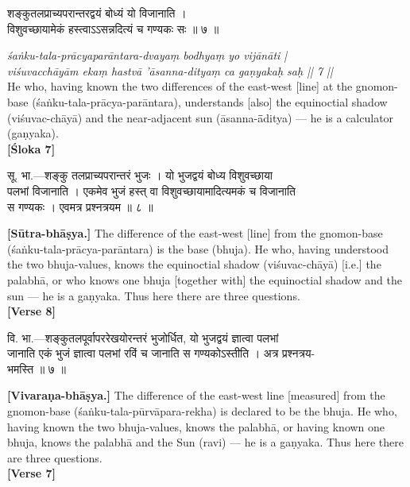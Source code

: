 \documentclass[11pt,a4paper]{article}
\newcommand{\dev}[1]{{\devanagarifont #1}}
\newcommand{\bilingualpair}[2]{%
  \noindent%
  \begin{minipage}[t]{0.48\textwidth}
    #1%
  \end{minipage}%
  \hfill%
  \begin{minipage}[t]{0.48\textwidth}
    #2%
  \end{minipage}%
  \par\vspace{0.5em}%
}
\newenvironment{sanskritcol}{\devanagarifont\small}{}
\newenvironment{englishcol}{\iastfont\small}{}
\begin{document}
\vspace{0.3cm}
\bilingualpair{%
\begin{sanskritcol}
\dev{शङ्कुतलप्राच्यपरान्तरद्वयं बोध्यं यो विजानाति ।}\\[0.3em]
\dev{विशुवच्छायामेकं हस्त्वाऽऽसन्नदित्यं च गण्यकः सः ॥ ७ ॥}
\end{sanskritcol}%
}{%
\begin{englishcol}
\textit{\'saṅku-tala-prācyaparāntara-dvayaṃ bodhyaṃ yo vijānāti |}\\[0.3em]
\textit{vi\'suvacchāyām ekaṃ hastvā '\=asanna-dityaṃ ca gaṇyakaḥ saḥ || 7 ||}\\[0.3em]
He who, having known the two differences of the east-\-west [line] at the gnomon-\-base (\'saṅku-tala-prācya-parāntara), understands [also] the equinoctial shadow (vi\'suvac-chāyā) and the near-\-adjacent sun (\=asanna-\=āditya) --- he is a calculator (gaṇyaka).\\[0.3em]
\hfill \textbf{[Śloka 7]}
\end{englishcol}%
}

\vspace{0.3cm}
\bilingualpair{%
\begin{sanskritcol}
\dev{सू. भा.---शङ्कु तलप्राच्यपरान्तरं भुजः । यो भुजद्वयं बोध्य विशुवच्छाया}\\[0.3em]
\dev{पलभां विजानाति । एकमेव भुजं हस्त् वा विशुवच्छायामादित्यमकं च विजानाति}\\[0.3em]
\dev{स गण्यकः । एवमत्र प्रश्नत्रयम ॥ ८ ॥}
\end{sanskritcol}%
}{%
\begin{englishcol}
\textbf{[Sūtra-bhāṣya.]} The difference of the east-\-west [line] from the gnomon-\-base (\'saṅku-tala-prācya-parāntara) is the base (bhuja). He who, having understood the two bhuja-\-values, knows the equinoctial shadow (vi\'suvac-chāyā) [i.e.] the palabhā, or who knows one bhuja [together with] the equinoctial shadow and the sun --- he is a gaṇyaka. Thus here there are three questions.\\[0.3em]
\hfill \textbf{[Verse 8]}
\end{englishcol}%
}

\vspace{0.3cm}
\bilingualpair{%
\begin{sanskritcol}
\dev{वि. भा.---शङ्कुतलपूर्वापररेखयोरन्तरं भुजोर्धित, यो भुजद्वयं ज्ञात्वा पलभां}\\[0.3em]
\dev{जानाति एकं भुजं ज्ञात्वा पलभां रविं च जानाति स गण्यकोऽस्तीति । अत्र प्रश्नत्रय-}\\[0.3em]
\dev{भमस्ति ॥ ७ ॥}
\end{sanskritcol}%
}{%
\begin{englishcol}
\textbf{[Vivaraṇa-bhāṣya.]} The difference of the east-\-west line [measured] from the gnomon-\-base (\'saṅku-tala-pūrvāpara-rekha) is declared to be the bhuja. He who, having known the two bhuja-\-values, knows the palabhā, or having known one bhuja, knows the palabhā and the Sun (ravi) --- he is a gaṇyaka. Thus here there are three questions.\\[0.3em]
\hfill \textbf{[Verse 7]}
\end{englishcol}%
}
\end{document}
